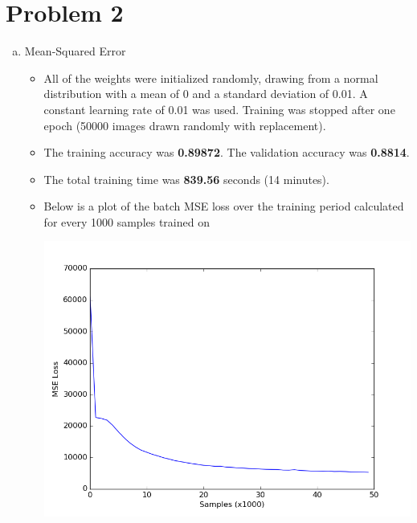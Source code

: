\documentclass{article}
\begin{document}
\section*{Problem 2}
\begin{enumerate}[a.]
  \item Mean-Squared Error
    \begin{itemize}
      \item All of the weights were initialized randomly, drawing from a normal distribution with a mean of 0 and a standard deviation of 0.01. A constant learning rate of 0.01 was used. Training was stopped after one epoch (50000 images drawn randomly with replacement).
      \item The training accuracy was \textbf{0.89872}. The validation accuracy was \textbf{0.8814}.
      \item The total training time was \textbf{839.56} seconds (14 minutes).
      \item Below is a plot of the batch MSE loss over the training period calculated for every 1000 samples trained on
        \begin{center}
          \includegraphics[scale=0.5]{mse_loss}
        \end{center}


\end{itemize}
\end{enumerate}
\end{document}
